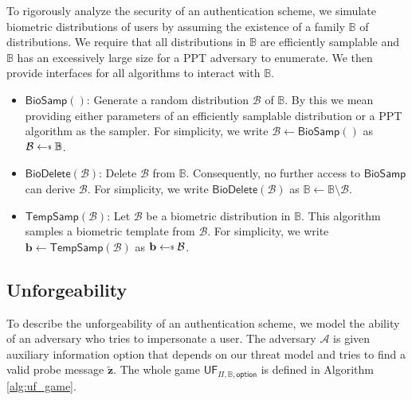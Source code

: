 To rigorously analyze the security of an authentication scheme, we simulate biometric distributions of users by assuming the existence of a family $\mathbb{B}$ of distributions. We require that all distributions in $\mathbb{B}$ are efficiently samplable and $\mathbb{B}$ has an excessively large size for a PPT adversary to enumerate. We then provide interfaces for all algorithms to interact with $\mathbb{B}$.

\begin{itemize}

	\item $\textsf{BioSamp}()$: Generate a random distribution $\mathcal{B}$ of $\mathbb{B}$. By this we mean providing either parameters of an efficiently samplable distribution or a PPT algorithm as the sampler. For simplicity, we write $\mathcal{B} \gets \textsf{BioSamp}()$ as $\mathcal{B} \getsdollar \mathbb{B}$.
	
	\item $\textsf{BioDelete}(\mathcal{B})$: Delete $\mathcal{B}$ from $\mathbb{B}$. Consequently, no further access to $\textsf{BioSamp}$ can derive $\mathcal{B}$. For simplicity, we write $\textsf{BioDelete}(\mathcal{B})$ as $\mathbb{B} \gets \mathbb{B} \setminus \mathcal{B}$.

	\item $\textsf{TempSamp}(\mathcal{B})$: Let $\mathcal{B}$ be a biometric distribution in $\mathbb{B}$. This algorithm samples a biometric template from $\mathcal{B}$. For simplicity, we write $\mathbf{b} \gets \textsf{TempSamp}(\mathcal{B})$ as $\mathbf{b} \getsdollar \mathcal{B}$.

\end{itemize}



\subsection{Unforgeability}
\label{sec:uf_game}

To describe the unforgeability of an authentication scheme, we model the ability of an adversary who tries to impersonate a user. The adversary $\mathcal{A}$ is given auxiliary information \textsf{option} that depends on our threat model and tries to find a valid probe message $\mathbf{\tilde{z}}$. The whole game $\textsf{UF}_{\Pi, \mathbb{B}, \textsf{option}}$ is defined in Algorithm \ref{alg:uf_game}.

